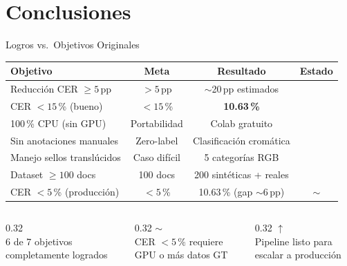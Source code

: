 \documentclass[aspectratio=169, 11pt]{beamer}
\newcommand{\azul}[1]{\textcolor{AccBlue}{#1}}
\newcommand{\verde}[1]{\textcolor{AccGreen}{#1}}
\newcommand{\amber}[1]{\textcolor{AccAmber}{#1}}
\begin{document}
\section{Conclusiones}

\begin{frame}{Logros vs.\ Objetivos Originales}
  \centering
  \footnotesize
  \begin{tabular}{@{}p{4.0cm}ccc@{}}
    \toprule
    \textbf{Objetivo}
      & \textbf{Meta}
      & \textbf{Resultado}
      & \textbf{Estado} \\
    \midrule
    Reducción CER $\geq 5$\,pp
      & $>5$\,pp
      & $\sim$20\,pp estimados
      & \verde{\checkmark} \\[3pt]
    CER $< 15$\,\% (bueno)
      & $<15$\,\%
      & \textbf{10.63\,\%}
      & \verde{\checkmark} \\[3pt]
    100\,\% CPU (sin GPU)
      & Portabilidad
      & Colab gratuito
      & \verde{\checkmark} \\[3pt]
    Sin anotaciones manuales
      & Zero-label
      & Clasificación cromática
      & \verde{\checkmark} \\[3pt]
    Manejo sellos translúcidos
      & Caso difícil
      & 5 categorías RGB
      & \verde{\checkmark} \\[3pt]
    Dataset $\geq 100$ docs
      & 100 docs
      & 200 sintéticas + reales
      & \verde{\checkmark} \\[3pt]
    CER $<5$\,\% (producción)
      & $<5$\,\%
      & 10.63\,\% (gap $\sim$6\,pp)
      & \amber{$\sim$} \\
    \bottomrule
  \end{tabular}

  \vspace{10pt}
  \begin{columns}[T]
    \begin{column}{0.32\textwidth}
      \centering\verde{\LARGE\checkmark}\\
      \scriptsize 6 de 7 objetivos\\completamente logrados
    \end{column}
    \begin{column}{0.32\textwidth}
      \centering\amber{\Large$\sim$}\\
      \scriptsize CER $<5\,\%$ requiere\\GPU o más datos GT
    \end{column}
    \begin{column}{0.32\textwidth}
      \centering\azul{\large$\uparrow$}\\
      \scriptsize Pipeline listo para\\escalar a producción
    \end{column}
  \end{columns}
\end{frame}
\end{document}

